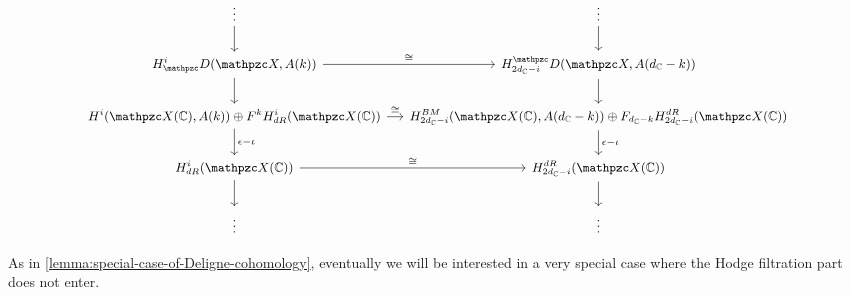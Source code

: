 \[ \begin{tikzcd}[column sep=small,font=\small]
    \vdots \ar{d} & \vdots \ar{d} \\
    H^i_\mathcal{D} (\mathcal{X}, A (k)) \ar{d}\ar{r}{\isom} & H_{2d_\CC-i}^\mathcal{D} (\mathcal{X}, A (d_\CC-k)) \ar{d} \\
    H^i (\mathcal{X} (\CC), A (k)) \oplus F^k H^i_{dR} (\mathcal{X} (\CC)) \ar{d}{\epsilon-\iota}\ar{r}{\isom} & H^{BM}_{2d_\CC-i} (\mathcal{X} (\CC), A (d_\CC-k)) \oplus F_{d_\CC-k} H_{2d_\CC-i}^{dR} (\mathcal{X} (\CC)) \ar{d}{\epsilon-\iota} \\
    H^i_{dR} (\mathcal{X} (\CC)) \ar{d}\ar{r}{\isom} & H_{2d_\CC-i}^{dR} (\mathcal{X} (\CC)) \ar{d} \\
    \vdots & \vdots
  \end{tikzcd} \]

As in \ref{lemma:special-case-of-Deligne-cohomology}, eventually we will be
interested in a very special case where the Hodge filtration part does not
enter.

